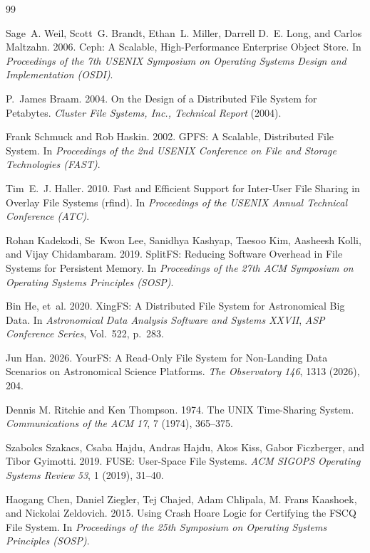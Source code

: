 \documentclass[numberedsection,acmtos]{acmart}
\begin{document}
\begin{thebibliography}{99}

Sage~A. Weil, Scott~G. Brandt, Ethan~L. Miller, Darrell D.~E. Long, and
Carlos Maltzahn. 2006. Ceph: A Scalable, High-Performance Enterprise Object
Store. In \emph{Proceedings of the 7th USENIX Symposium on Operating Systems
Design and Implementation (OSDI)}.

P.~James Braam. 2004. On the Design of a Distributed File System for
Petabytes. \emph{Cluster File Systems, Inc., Technical Report} (2004).

Frank Schmuck and Rob Haskin. 2002. GPFS: A Scalable, Distributed File
System. In \emph{Proceedings of the 2nd USENIX Conference on File and Storage
Technologies (FAST)}.

Tim~E.~J. Haller. 2010. Fast and Efficient Support for Inter-User File
Sharing in Overlay File Systems (rfind). In \emph{Proceedings of the USENIX
Annual Technical Conference (ATC)}.

Rohan Kadekodi, Se~Kwon Lee, Sanidhya Kashyap, Taesoo Kim, Aasheesh Kolli,
and Vijay Chidambaram. 2019. SplitFS: Reducing Software Overhead in File
Systems for Persistent Memory. In \emph{Proceedings of the 27th ACM Symposium
on Operating Systems Principles (SOSP)}.

Bin He, et~al. 2020. XingFS: A Distributed File System for Astronomical Big
Data. In \emph{Astronomical Data Analysis Software and Systems XXVII},
\emph{ASP Conference Series}, Vol.~522, p.~283.

Jun Han. 2026. YourFS: A Read-Only File System for Non-Landing Data Scenarios
on Astronomical Science Platforms. \emph{The Observatory} \emph{146}, 1313
(2026), 204.

Dennis M. Ritchie and Ken Thompson. 1974. The UNIX Time-Sharing System.
\emph{Communications of the ACM} \emph{17}, 7 (1974), 365--375.

Szabolcs Szakacs, Csaba Hajdu, Andras Hajdu, Akos Kiss, Gabor Ficzberger, and
Tibor Gyimotti. 2019. FUSE: User-Space File Systems. \emph{ACM SIGOPS
Operating Systems Review} \emph{53}, 1 (2019), 31--40.

Haogang Chen, Daniel Ziegler, Tej Chajed, Adam Chlipala, M. Frans Kaashoek,
and Nickolai Zeldovich. 2015. Using Crash Hoare Logic for Certifying the FSCQ
File System. In \emph{Proceedings of the 25th Symposium on Operating Systems
Principles (SOSP)}.


\end{thebibliography}
\end{document}
